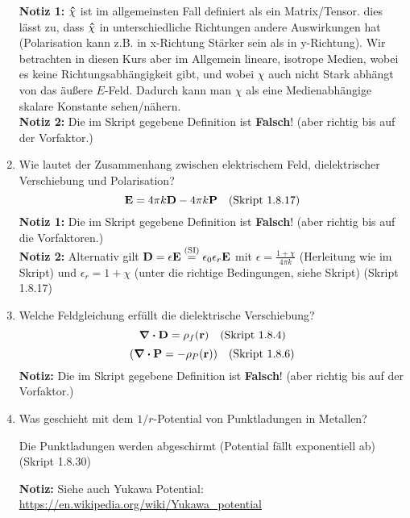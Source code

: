 \begin{enumerate}
\begin{center}
\begin{tabular}{lll}
        \end{tabular}
        \end{center}
        \textbf{Notiz 1:} $\vu \chi$ ist im allgemeinsten Fall 
        definiert als ein Matrix/Tensor.
        dies lässt zu, dass $\vu \chi$ in unterschiedliche Richtungen
        andere Auswirkungen hat (Polarisation kann z.B. in x-Richtung
        Stärker sein als in y-Richtung). Wir betrachten in diesen Kurs 
        aber im Allgemein
        lineare, isotrope Medien, wobei es keine Richtungsabhängigkeit
        gibt, und wobei $\chi$ auch nicht Stark abhängt von das äußere
        $E$-Feld. Dadurch kann
        man $\chi$ als eine Medienabhängige skalare Konstante 
        sehen/nähern.\\
        \textbf{Notiz 2:} Die im Skript gegebene Definition ist 
        \textbf{Falsch}! (aber richtig bis auf der Vorfaktor.)\\

  \item Wie lautet der Zusammenhang zwischen elektrischem Feld, 
        dielektrischer Verschiebung und Polarisation?
        $$\vb E= 4\pi k\vb D - 4\pi k\vb P \quad\text{(Skript 1.8.17)}$$
        \textbf{Notiz 1:} Die im Skript gegebene Definition ist 
        \textbf{Falsch}! (aber richtig bis auf die Vorfaktoren.)\\
        \textbf{Notiz 2:} Alternativ gilt $\vb D=\epsilon \vb E
        \stackrel{\text{(SI)}}=\epsilon_0\epsilon_r \vb E$ mit
        $\epsilon=\frac{1+\chi}{4\pi k}$ (Herleitung wie im Skript) und
        $\epsilon_r=1+\chi$
        (unter die richtige Bedingungen, siehe Skript) (Skript 1.8.17)\\

  \item Welche Feldgleichung erfüllt die dielektrische Verschiebung?
        $$\div \vb D=\rho_f(\vb r)\quad\text{(Skript 1.8.4)}$$
        $$\qty(\div \vb P=-\rho_P(\vb r))\quad\text{(Skript 1.8.6)}$$
        \textbf{Notiz:} Die im Skript gegebene Definition ist 
        \textbf{Falsch}! (aber richtig bis auf der Vorfaktor.)

  \item Was geschieht mit dem $1/r$-Potential von Punktladungen in
        Metallen?
        \begin{center}
          Die Punktladungen werden abgeschirmt (Potential fällt 
          exponentiell ab)
          (Skript 1.8.30)
        \end{center}
        \textbf{Notiz:} Siehe auch Yukawa Potential: 
        \url{https://en.wikipedia.org/wiki/Yukawa_potential} 


\end{enumerate}
